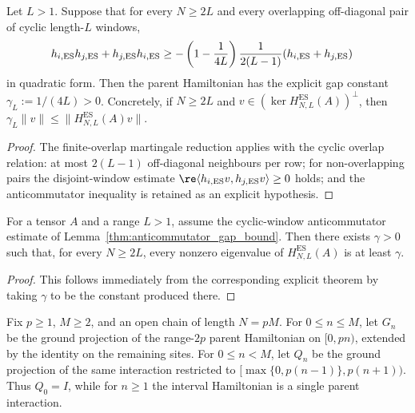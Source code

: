 \begin{lemma}
    \label{thm:anticommutator_gap_bound}
    \leanok
    Let $L>1$. Suppose that for every $N\ge2L$ and every overlapping
    off-diagonal pair of cyclic length-$L$ windows,
    \begin{align}
        h_{i,\mathrm{ES}}h_{j,\mathrm{ES}}
        +h_{j,\mathrm{ES}}h_{i,\mathrm{ES}}
         & \ge
        -\left(1-\frac{1}{4L}\right)\frac{1}{2(L-1)}
        (h_{i,\mathrm{ES}}+h_{j,\mathrm{ES}})
        \notag
    \end{align}
    in quadratic form. Then the parent Hamiltonian has the explicit gap
    constant $\gamma_L:=1/(4L)>0$.
    Concretely, if $N\ge2L$ and
    $v\in(\ker H_{N,L}^{\mathrm{ES}}(A))^\perp$, then
    $\gamma_L\|v\| \le \|H_{N,L}^{\mathrm{ES}}(A)v\|$.
\end{lemma}

\begin{proof}
    \leanok
    The finite-overlap martingale reduction applies with the cyclic overlap
    relation: at most $2(L-1)$ off-diagonal neighbours per row; for
    non-overlapping pairs the disjoint-window estimate
    $\re\langle h_{i,\mathrm{ES}}v,h_{j,\mathrm{ES}}v\rangle\ge 0$ holds;
    and the anticommutator inequality is retained as an explicit hypothesis.
\end{proof}

\begin{lemma}
    \label{thm:parent_hamiltonian_gapped}
    \leanok
    For a tensor $A$ and a range $L>1$, assume the cyclic-window
    anticommutator estimate of Lemma~\ref{thm:anticommutator_gap_bound}.
    Then there exists $\gamma>0$
    such that, for every $N\ge2L$, every nonzero eigenvalue of
    $H_{N,L}^{\mathrm{ES}}(A)$ is at least $\gamma$.
\end{lemma}

\begin{proof}
    \leanok
    This follows immediately from the corresponding explicit theorem by taking
    $\gamma$ to be the constant produced there.
\end{proof}

\begin{definition}
    \label{def:grouped_open_ground_projections}
    \leanok
    Fix $p\geq1$, $M\geq2$, and an open chain of length $N=pM$.
    For $0\leq n\leq M$, let $G_n$ be the ground projection of the range-$2p$ parent
    Hamiltonian on $[0,pn)$, extended by the identity on the remaining
    sites. For $0\leq n<M$, let $Q_n$ be the ground projection of the same interaction
    restricted to $[\max\{0,p(n-1)\},p(n+1))$.
    Thus $Q_0=I$, while for $n\geq1$ the interval Hamiltonian is
    a single parent interaction.
\end{definition}

